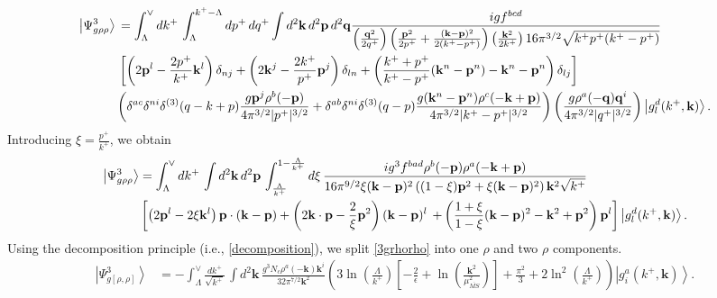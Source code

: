 \documentclass[aps,prd,amsmath,amssymb,nofootinbib]{revtex4-2}
\numberwithin{equation}{section}
\begin{document}
\begin{align}\label{part2}
\left|\Psi_{g\rho\rho}^{3}\right\rangle \, & =\int_{\Lambda}^{\vee}dk^{+}\,\int_{\Lambda}^{k^{+}-\Lambda}dp^{+}\, dq^{+}\int d^{2}\mathbf{k}\, d^{2}\mathbf{p}\, d^{2}\mathbf{q}  \frac{igf^{bcd}}{\left(\frac{\mathbf{q}^{2}}{2q^{+}}\right)\left(\frac{\mathbf{p}^{2}}{2p^{+}}+\frac{(\mathbf{k}-\mathbf{p})^{2}}{2(k^{+}-p^{+})}\right)\left(\frac{\mathbf{k}^{2}}{2k^{+}}\right)16\pi^{3/2}\sqrt{k^{+}p^{+}(k^{+}-p^{+})}}\notag \\ &\left[\left(2\mathbf{p}^{l}-\frac{2p^{+}}{k^{+}}\mathbf{k}^{l}\right)\delta_{nj}+\left(2\mathbf{k}^{j}-\frac{2k^{+}}{p^{+}}\mathbf{p}^{j}\right)\delta_{ln}+\left(\frac{k^{+}+p^{+}}{k^{+}-p^{+}}(\mathbf{k}^{n}-\mathbf{p}^{n})-\mathbf{k}^{n}-\mathbf{p}^{n}\right)\delta_{lj}\right]\notag \\ &\bigg(\delta^{ac}\delta^{ni}\delta^{(3)}(q-k+p)\frac{g\mathbf{p}^{j}\rho^{b}(-\mathbf{p})}{4\pi^{3/2}|p^{+}|^{3/2}}+\delta^{ab}\delta^{ni}\delta^{(3)}(q-p)\frac{g(\mathbf{k}^{n}-\mathbf{p}^{n})\rho^{c}(-\mathbf{k}+\mathbf{p})}{4\pi^{3/2}|k^{+}-p^{+}|^{3/2}}\bigg)\left(\frac{g\rho^{a}(-\mathbf{q})\mathbf{q}^{i}}{4\pi^{3/2}|q^{+}|^{3/2}}\right)\left|g_{l}^{d}(k^{+},\mathbf{k})\right\rangle.
\end{align}
Introducing $\xi = \frac{p^{+}}{k^{+}}$, we obtain
 \begin{align}\label{3grhorho}
\left|\Psi_{g\rho\rho}^{3}\right\rangle & =\int_{\Lambda}^{\vee}dk^{+}\,\int d^{2}\mathbf{k}\, d^{2}\mathbf{p}\,\int_{\frac{\Lambda}{k^{+}}}^{1-\frac{\Lambda}{k^{+}}}d\xi\,\frac{ig^{3}f^{bad}\rho^{b}(-\mathbf{p})\rho^{a}(-\mathbf{k}+\mathbf{p})}{16\pi^{9/2}\xi(\mathbf{k}-\mathbf{p})^{2}\left((1-\xi)\mathbf{p}^{2}+\xi(\mathbf{k}-\mathbf{p})^{2}\right)\mathbf{k}^{2}\sqrt{k^{+}}}\notag \\ & \left[\left(2\mathbf{p}^{l}-2\xi \mathbf{k}^{l}\right)\mathbf{p}\cdot(\mathbf{k}-\mathbf{p})+\left(2\mathbf{k}\cdot \mathbf{p}-\frac{2}{\xi}\mathbf{p}^{2}\right)(\mathbf{k}-\mathbf{p})^{l}\right.\left.+\left(\frac{1+\xi}{1-\xi}(\mathbf{k}-\mathbf{p})^{2}-\mathbf{k}^{2}+\mathbf{p}^{2}\right)\mathbf{p}^{l}\right]\left|g_{l}^{d}(k^{+},\mathbf{k})\right\rangle.
\end{align}
Using the decomposition principle (i.e., \eqref{decomposition}), we split \eqref{3grhorho} into one $\rho$ and two $\rho$ components.
\begin{align}\label{onerho2}
\left|\Psi_{g[\rho,\rho]}^{3}\right\rangle & = -\int_{\Lambda}^{\vee}\frac{dk^{+}}{\sqrt{k^{+}}}\,\int d^{2}\mathbf{k}\,\frac{g^{3}N_{c}\rho^{a}(-\mathbf{k})\mathbf{k}^{i}}{32\pi^{7/2}\mathbf{k}^{2}}\left(3\ln\left(\frac{\Lambda}{k^{+}}\right)\left[-\frac{2}{\epsilon}+\ln\left(\frac{\mathbf{k}^{2}}{\mu_{\overline{MS}}^{2}}\right)\right]+\frac{\pi^{2}}{3}+2\ln^{2}\left(\frac{\Lambda}{k^{+}}\right)\right)\left|g_{i}^{a}(k^{+},\mathbf{k})\right\rangle .
\end{align}
\end{document}
